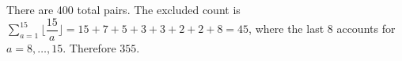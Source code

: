 There are 400 total pairs. The excluded count is $\sum_{a=1}^{15}\lfloor\dfrac{15}{a}\rfloor=15+7+5+3+3+2+2+8=45$, where the last 8 accounts for $a=8,\ldots,15$. Therefore $\boxed{355}$.

